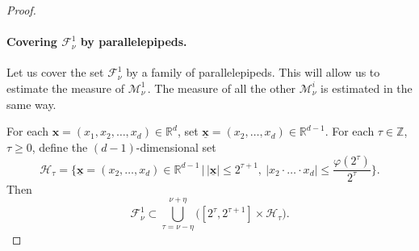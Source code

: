 \documentclass[10pt,a4paper]{amsart}
\newcommand{\R}{\mathbb{R}}
\newcommand{\Z}{\mathbb{Z}}
\newcommand{\cF}{\mathcal{F}}
\newcommand{\cH}{\mathcal{H}}
\newcommand{\cM}{\mathcal{M}}
\renewcommand{\geq}{\geqslant}
\renewcommand{\leq}{\leqslant}
\renewcommand{\vec}[1]{\mathbf{#1}}
\begin{document}
\begin{proof}
  \paragraph{Covering $\cF^1_\nu$ by parallelepipeds.}
  
  Let us cover the set $\cF^1_\nu$ by a family of paralle\-le\-pi\-peds. This will allow us to estimate the measure of $\cM^1_\nu$\,. The measure of all the other $\cM^i_\nu$ is estimated in the same way.

  For each $\vec x=(x_1,x_2,\ldots,x_d)\in\R^d$, set $\underline{\vec x}=(x_2,\ldots,x_d)\in\R^{d-1}$.
  For each $\tau\in\Z$, $\tau\geq0$, define the $(d-1)$-dimensional set
  \[
    \cH_\tau=\Big\{\underline{\vec x}=(x_2,\ldots,x_d)\in\R^{d-1} \,\Big|\, |\underline{\vec x}|\leq2^{\tau+1},\ 
                                                                            |x_2\cdot\ldots\cdot x_d|\leq\frac{\varphi(2^\tau)}{2^\tau} \Big\}.
  \]
  Then 
  \begin{equation}\label{eq:F_1_nu_hyperbolic_covering}
    \cF^1_\nu\subset\bigcup_{\tau=\nu-\eta}^{\nu+\eta}\Big([2^\tau,2^{\tau+1}]\times\cH_\tau\Big).
  \end{equation}


\end{proof}
\end{document}
